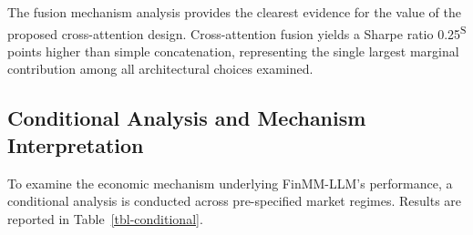 \documentclass[
  11pt,
  a4paper,
]{article}
\begin{document}
The fusion mechanism analysis provides the clearest evidence for the
value of the proposed cross-attention design. Cross-attention fusion
yields a Sharpe ratio 0.25\textsuperscript{S} points higher than simple
concatenation, representing the single largest marginal contribution
among all architectural choices examined.

\subsection{Conditional Analysis and Mechanism
Interpretation}\label{conditional-analysis-and-mechanism-interpretation}

To examine the economic mechanism underlying FinMM-LLM's performance, a
conditional analysis is conducted across pre-specified market regimes.
Results are reported in Table~\ref{tbl-conditional}.
\end{document}
